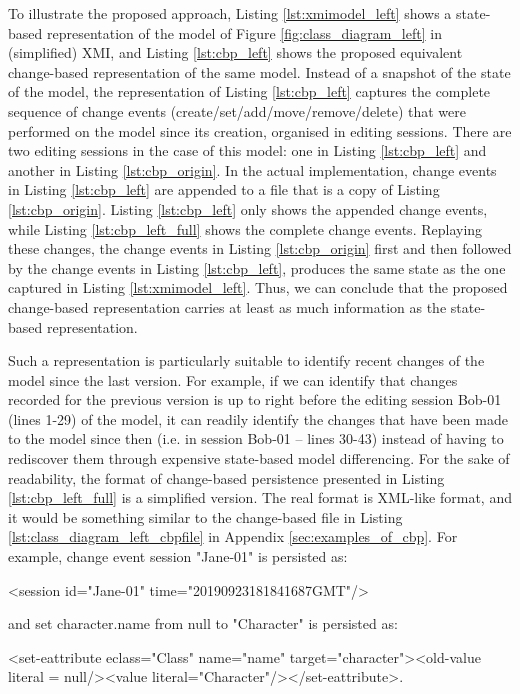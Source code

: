 To illustrate the proposed approach, Listing \ref{lst:xmimodel_left} shows a state-based representation of the model of Figure \ref{fig:class_diagram_left} in (simplified) XMI, and Listing \ref{lst:cbp_left} shows the proposed equivalent change-based representation of the same model. Instead of a snapshot of the state of the model, the representation of Listing \ref{lst:cbp_left} captures the complete sequence of change events (create/set/add/move/remove/delete) that were performed on the model since its creation, organised in editing sessions. There are two editing sessions in the case of this model: one in Listing \ref{lst:cbp_left} and another in Listing \ref{lst:cbp_origin}. In the actual implementation, change events in Listing \ref{lst:cbp_left} are appended to a file that is a copy of Listing \ref{lst:cbp_origin}. Listing \ref{lst:cbp_left} only shows the appended change events, while Listing \ref{lst:cbp_left_full} shows the complete change events. Replaying these changes, the change events in Listing \ref{lst:cbp_origin} first and then followed by the change events in Listing \ref{lst:cbp_left}, produces the same state as the one captured in Listing \ref{lst:xmimodel_left}. Thus, we can conclude that the proposed change-based representation carries at least as much information as the state-based representation. 

Such a representation is particularly suitable to identify recent changes of the model since the last version. For example, if we can identify that changes recorded for the previous version is up to right before the editing session \textsf{Bob-01} (lines 1-29) of the model, it can readily identify the changes that have been made to the model since then (i.e. in session \textsf{Bob-01} -- lines 30-43) instead of having to rediscover them through expensive state-based model differencing.
For the sake of readability, the format of change-based persistence presented in Listing \ref{lst:cbp_left_full} is a simplified version. The real format is XML-like format, and it would be something similar to the change-based file in Listing \ref{lst:class_diagram_left_cbpfile} in Appendix \ref{sec:examples_of_cbp}. For example, change event \textsf{session "Jane-01"} is persisted as:

\textsf{<session id="Jane-01" time="20190923181841687GMT"/>} 

and \textsf{set character.name from null to "Character"} is persisted as:

\textsf{<set-eattribute eclass="Class" name="name" target="character"><old-value literal = null/><value literal="Character"/></set-eattribute>}.

